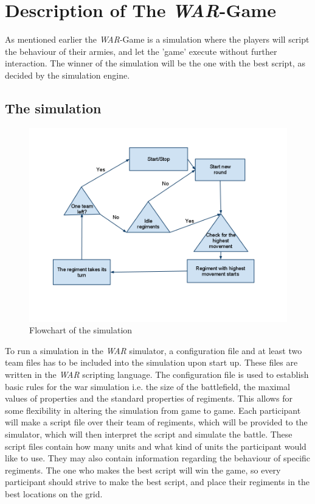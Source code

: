 \section{Description of The \textit{WAR}-Game}\label{sec:describeWAR}
As mentioned earlier the \textit{WAR}-Game is a simulation where the players will script the behaviour of their armies, and let the 'game' execute without further interaction. The winner of the simulation will be the one with the best script, as decided by the simulation engine.
	\subsection{The simulation}
	\begin{figure}
	\centering
	\includegraphics[scale=0.4]{rapport/2/figures/FlowChartSimulation}
	\caption{ Flowchart of the simulation } \label{fig:FlowChartSimulation}
	\end{figure}		
		To run a simulation in the \textit{WAR} simulator, a configuration file and at least two team files has to be included into the simulation upon start up. These files are written in the \textit{WAR} scripting language.
		The configuration file is used to establish basic rules for the war simulation i.e. the size of the battlefield, the maximal values of properties and the standard properties of regiments.
		This allows for some flexibility in altering the simulation from game to game.
		Each participant will make a script file over their team of regiments, which will be provided to the simulator, which will then interpret the script and simulate the battle. These script files contain how many units and what kind of units the participant would like to use.	They may also contain information regarding the behaviour of specific regiments. The one who makes the best script will win the game, so every participant should strive to make the best script, and place their regiments in the best locations on the grid.
